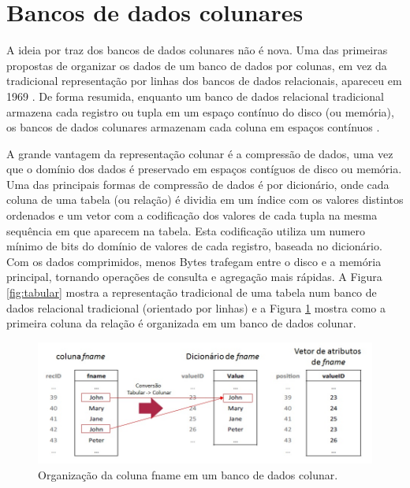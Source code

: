 \section{Bancos de dados colunares} 
\label{sec:colunar}

A ideia por traz dos bancos de dados colunares não é nova. Uma das primeiras propostas de organizar os 
dados de um banco de dados por colunas, em vez da tradicional representação por linhas dos bancos de 
dados relacionais, apareceu em 1969 \cite{estabrook1969theory}. De forma resumida, enquanto um banco de 
dados relacional tradicional armazena cada registro ou tupla em um espaço contínuo do disco (ou memória), 
os bancos de dados colunares armazenam cada coluna em espaços contínuos \cite{Abadi2009}. 

A grande vantagem da representação colunar é a compressão de dados, uma vez que o domínio dos dados 
é preservado em espaços contíguos de disco ou memória. 
Uma das principais formas de compressão de dados é por dicionário, onde cada coluna de uma 
tabela (ou relação) é dividia em um índice com os valores distintos ordenados e um vetor com a 
codificação dos valores de cada tupla na mesma sequência em que aparecem na tabela. 
Esta codificação utiliza um numero mínimo de bits do domínio de valores de cada registro, 
baseada no dicionário. Com os dados comprimidos, menos Bytes trafegam entre o disco e a 
memória principal, tornando operações de consulta e agregação mais rápidas.
A Figura \ref{fig:tabular} mostra a representação tradicional de uma tabela num banco de dados 
relacional tradicional (orientado por linhas) e a Figura \ref{fig:colunar} mostra como a 
primeira coluna da relação é organizada em um banco de dados colunar.

\begin{figure}
	\centering
	\includegraphics[width=\linewidth]{./Representacao_colunar.jpg}
	\caption{Organização da coluna fname em um banco de dados colunar.}
	\label{fig:colunar}
\end{figure}


